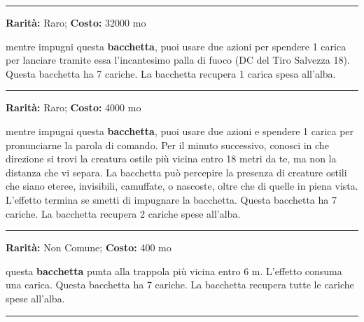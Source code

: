 \begin{multicols}{2}


\smallskip\noindent\rule{\linewidth}{2pt}  \hypertarget{BacchettadellePallediFuoco}{}\smallskip{}\noindent\label{BacchettadellePallediFuoco}

\textbf{Rarità:} Raro; \textbf{Costo:} 32000 mo

mentre impugni questa \textbf{bacchetta}, puoi usare due azioni per spendere 1 carica per lanciare tramite essa l'incantesimo palla di fuoco (DC del Tiro Salvezza 18). Questa bacchetta ha 7 cariche. La bacchetta recupera 1 carica spesa all'alba.

\smallskip\noindent\rule{\linewidth}{2pt}  \hypertarget{BacchettadiIndivid.deiNemici}{}\smallskip{}\noindent\label{BacchettadiIndivid.deiNemici}

\textbf{Rarità:} Raro; \textbf{Costo:} 4000 mo

mentre impugni questa \textbf{bacchetta}, puoi usare due azioni e spendere 1 carica per pronunciarne la parola di comando. Per il minuto successivo, conosci in che direzione si trovi la creatura ostile più vicina entro 18 metri da te, ma non la distanza che vi separa. La bacchetta può percepire la presenza di creature ostili che siano eteree, invisibili, camuffate, o nascoste, oltre che di quelle in piena vista. L'effetto termina se smetti di impugnare la bacchetta. Questa bacchetta ha 7 cariche. La bacchetta recupera 2 cariche spese all'alba.

\smallskip\noindent\rule{\linewidth}{2pt}  \hypertarget{BacchettaScopritrappole}{}\smallskip{}\noindent\label{BacchettaScopritrappole}

\textbf{Rarità:} Non Comune; \textbf{Costo:} 400 mo

questa \textbf{bacchetta} punta alla trappola più vicina entro 6 m. L'effetto consuma una carica. Questa bacchetta ha 7 cariche. La bacchetta recupera tutte le cariche spese all'alba.

\smallskip\noindent\rule{\linewidth}{2pt}  \hypertarget{Bacinelladell'annegamento}{}\smallskip{}\noindent\label{Bacinelladell'annegamento}


\end{multicols}
